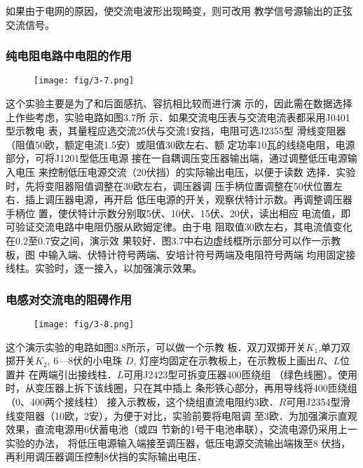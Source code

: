 如果由于电网的原因，使交流电波形出现畸变，则可改用
教学信号源输出的正弦交流信号。

\subsubsection{纯电阻电路中电阻的作用}
\begin{figure}[htp]
    \centering
\texttt{[image: fig/3-7.png]}
    \caption{}
\end{figure}

这个实验主要是为了和后面感抗、容抗相比较而进行演
示的，因此需在数据选择上作些考虑，实验电路如图3.7所
示．如果交流电压表与交流电流表都采用J0401型示教电
表，其量程应选交流25伏与交流1安挡，电阻可选J2355型
滑线变阻器（阻值50欧，额定电流1.5安）或阻值30欧左右、额
定功率10瓦的线绕电阻，电源部分，可将J1201型低压电源
接在一自耦调压变压器输出端，通过调整低压电源输入电压
来控制低压电源交流（20伏挡）的实际输出电压，以便于读数
选择．实验时，先将变阻器阻值调整在30欧左右，调压器调
压手柄位置调整在50伏位置左右．插上调压器电源，再开启
低压电源的开关，观察伏特计示数。再调整调压器手柄位
置，使伏特计示数分别取5伏、10伏、15伏、20伏，读出相应
电流值，即可验证交流电路中电阻仍服从欧姆定律。由于电
阻取值30欧左右，其电流值变化在0.2至0.7安之间，演示效
果较好．图3.7中右边虚线框所示部分可以作一示教板，图
中输入端、伏特计符号两端、安培计符号两端及电阻符号两端
均用固定接线柱。实验时，逐一接入，以加强演示效果。


\subsubsection{电感对交流电的阻碍作用}

\begin{figure}[htp]
    \centering
\texttt{[image: fig/3-8.png]}
    \caption{}
\end{figure}

这个演示实验的电路如图3.8所示，可以做一个示教
板．双刀双掷开关$K_1$,单刀双掷开关$K_2$, 6—8伏的小电珠
$D$, 灯座均固定在示教板上，在示教板上画出$R$、$L$位置并
在两端引出接线柱．$L$可用J2423型可拆变压器400匝绕组
（绿色线圈）。使用时，从变压器上拆下该线圈，只在其中插上
条形铁心部分，再用导线将400匝绕组（0、400两个接线柱）
接入示教板，这个绕组直流电阻约3欧．$R$可用J2354型滑
线变阻器（10欧，2安），为便于对比，实验前要将电阻调
至3欧．为加强演示直观效果，直流电源用6伏蓄电池（或四
节新的1号干电池串联），交流电源仍采用上一实验的办法，
将低压电源输入端接至调压器，低压电源交流输出端拨至8
伏挡，再利用调压器调压控制8伏挡的实际输出电压．

